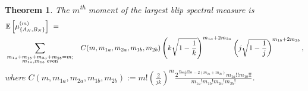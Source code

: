 \documentclass[11pt,reqno]{amsart}
\numberwithin{equation}{section}
\theoremstyle{plain}
\newtheorem{theorem}[thm]{Theorem}
\begin{document}
\begin{theorem}
The $m$\textsuperscript{th} moment of the largest blip spectral measure is 
\begin{align*}
&\mathbb{E}\left[\mu_{\{A_N,B_N\}}^{(m)}\right] \ = \ \\
&\sum_{\substack{m_{1a}+m_{1b}+m_{2a}+m_{2b}=m; \\ m_{1a},m_{1b}\textup{ even}}}&C(m, m_{1a}, m_{2a}, m_{1b}, m_{2b})\left(k\sqrt{1-\frac{1}{k}}\right)^{m_{1a}+2m_{2a}}\left(j\sqrt{1-\frac{1}{j}}\right)^{m_{1b}+2m_{2b}},\end{align*}
where $C(m, m_{1a}, m_{2a}, m_{1b}, m_{2b}):=m!\left(\frac{2}{jk}\right)^m\frac{2^{\frac{m_{1a}+m_{1b}}{2}-2(m_{2a}+m_{2b})}m_{1a}!!m_{1b}!!}{m_{1a}!m_{1b}!m_{2a}!m_{2b}!}$.
\end{theorem}
\end{document}
